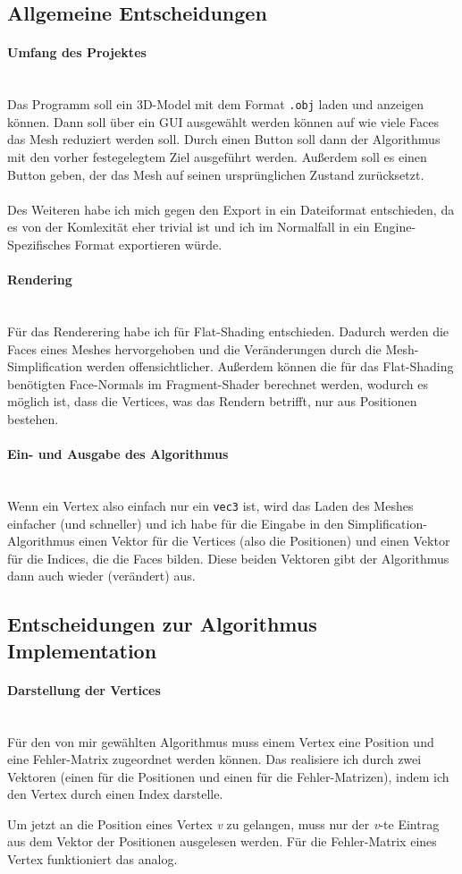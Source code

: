 \documentclass[a4paper,12pt]{article}
\newcommand{\myparagraph}[1]{\paragraph*{#1}\mbox{}\\}
\begin{document}
\subsection*{Allgemeine Entscheidungen}

\myparagraph{Umfang des Projektes}
Das Programm soll ein 3D-Model mit dem Format \texttt{.obj} laden und anzeigen können. Dann soll über ein GUI ausgewählt werden können auf wie viele Faces das Mesh reduziert werden soll. Durch einen Button soll dann der Algorithmus mit den vorher festegelegtem Ziel ausgeführt werden. Außerdem soll es einen Button geben, der das Mesh auf seinen ursprünglichen Zustand zurücksetzt.
\\
\\
Des Weiteren habe ich mich gegen den Export in ein Dateiformat entschieden, da es von der Komlexität eher trivial ist und ich im Normalfall in ein Engine-Spezifisches Format exportieren würde.

\myparagraph{Rendering}
Für das Renderering habe ich für Flat-Shading entschieden. Dadurch werden die Faces eines Meshes hervorgehoben und die Veränderungen durch die Mesh-Simplification werden offensichtlicher.
Außerdem können die für das Flat-Shading benötigten Face-Normals im Fragment-Shader berechnet werden, wodurch es möglich ist, dass die Vertices, was das Rendern betrifft, nur aus Positionen bestehen. 

\myparagraph{Ein- und Ausgabe des Algorithmus}
Wenn ein Vertex also einfach nur ein \texttt{vec3} ist, wird das Laden des Meshes einfacher (und schneller) und ich habe für die Eingabe in den Simplification-Algorithmus einen Vektor für die Vertices (also die Positionen) und einen Vektor für die Indices, die die Faces bilden. Diese beiden Vektoren gibt der Algorithmus dann auch wieder (verändert) aus.

\subsection*{Entscheidungen zur Algorithmus Implementation}

\myparagraph{Darstellung der Vertices}
Für den von mir gewählten Algorithmus muss einem Vertex eine Position und eine Fehler-Matrix zugeordnet werden können.
Das realisiere ich durch zwei Vektoren (einen für die Positionen und einen für die Fehler-Matrizen), indem ich den Vertex durch einen Index darstelle.

Um jetzt an die Position eines Vertex \emph{v} zu gelangen, muss nur der \emph{v}-te Eintrag aus dem Vektor der Positionen ausgelesen werden. Für die Fehler-Matrix eines Vertex funktioniert das analog.
\end{document}
